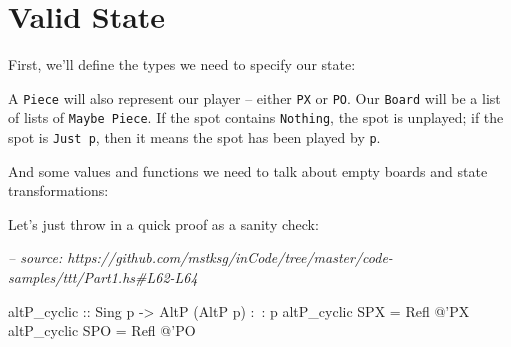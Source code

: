 \documentclass[]{article}
\newenvironment{Shaded}{}{}
\newcommand{\CommentTok}[1]{\textcolor[rgb]{0.38,0.63,0.69}{\textit{#1}}}
\newcommand{\DataTypeTok}[1]{\textcolor[rgb]{0.56,0.13,0.00}{#1}}
\newcommand{\FunctionTok}[1]{\textcolor[rgb]{0.02,0.16,0.49}{#1}}
\newcommand{\NormalTok}[1]{#1}
\newcommand{\OtherTok}[1]{\textcolor[rgb]{0.00,0.44,0.13}{#1}}
\begin{document}
\hypertarget{valid-state}{%
\section{Valid State}\label{valid-state}}

First, we'll define the types we need to specify our state:

\begin{Shaded}
\end{Shaded}

A \texttt{Piece} will also represent our player -- either \texttt{PX} or
\texttt{PO}. Our \texttt{Board} will be a list of lists of
\texttt{Maybe\ Piece}. If the spot contains \texttt{Nothing}, the spot is
unplayed; if the spot is \texttt{Just\ p}, then it means the spot has been
played by \texttt{p}.

And some values and functions we need to talk about empty boards and state
transformations:

\begin{Shaded}
\end{Shaded}

Let's just throw in a quick proof as a sanity check:

\begin{Shaded}
\begin{Highlighting}[]
\CommentTok{-- source: https://github.com/mstksg/inCode/tree/master/code-samples/ttt/Part1.hs#L62-L64}

\OtherTok{altP_cyclic ::} \DataTypeTok{Sing}\NormalTok{ p }\OtherTok{->} \DataTypeTok{AltP}\NormalTok{ (}\DataTypeTok{AltP}\NormalTok{ p) }\FunctionTok{:~:}\NormalTok{ p}
\NormalTok{altP_cyclic }\DataTypeTok{SPX} \FunctionTok{=} \DataTypeTok{Refl} \FunctionTok{@}\NormalTok{'}\DataTypeTok{PX}
\NormalTok{altP_cyclic }\DataTypeTok{SPO} \FunctionTok{=} \DataTypeTok{Refl} \FunctionTok{@}\NormalTok{'}\DataTypeTok{PO}
\end{Highlighting}
\end{Shaded}
\end{document}
